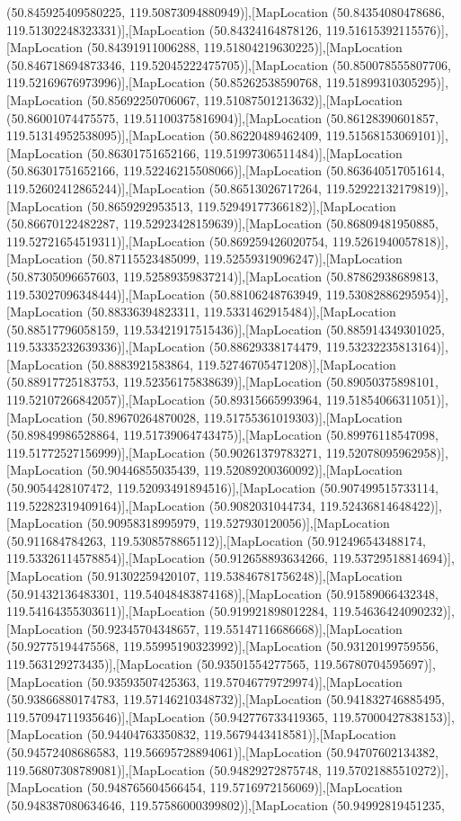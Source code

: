 (50.845925409580225, 119.50873094880949)],[MapLocation (50.84354080478686, 119.51302248323331)],[MapLocation (50.84324164878126, 119.51615392115576)],[MapLocation (50.84391911006288, 119.51804219630225)],[MapLocation (50.846718694873346, 119.52045222475705)],[MapLocation (50.850078555807706, 119.52169676973996)],[MapLocation (50.85262538590768, 119.51899310305295)],[MapLocation (50.85692250706067, 119.51087501213632)],[MapLocation (50.86001074475575, 119.51100375816904)],[MapLocation (50.86128390601857, 119.51314952538095)],[MapLocation (50.86220489462409, 119.51568153069101)],[MapLocation (50.86301751652166, 119.51997306511484)],[MapLocation (50.86301751652166, 119.52246215508066)],[MapLocation (50.863640517051614, 119.52602412865244)],[MapLocation (50.86513026717264, 119.52922132179819)],[MapLocation (50.8659292953513, 119.52949177366182)],[MapLocation (50.86670122482287, 119.52923428159639)],[MapLocation (50.86809481950885, 119.52721654519311)],[MapLocation (50.869259426020754, 119.5261940057818)],[MapLocation (50.87115523485099, 119.52559319096247)],[MapLocation (50.87305096657603, 119.52589359837214)],[MapLocation (50.87862938689813, 119.53027096348444)],[MapLocation (50.88106248763949, 119.53082886295954)],[MapLocation (50.88336394823311, 119.5331462915484)],[MapLocation (50.88517796058159, 119.53421917515436)],[MapLocation (50.885914349301025, 119.53335232639336)],[MapLocation (50.88629338174479, 119.53232235813164)],[MapLocation (50.8883921583864, 119.52746705471208)],[MapLocation (50.88917725183753, 119.52356175838639)],[MapLocation (50.89050375898101, 119.52107266842057)],[MapLocation (50.89315665993964, 119.51854066311051)],[MapLocation (50.89670264870028, 119.51755361019303)],[MapLocation (50.89849986528864, 119.51739064743475)],[MapLocation (50.89976118547098, 119.51772527156999)],[MapLocation (50.90261379783271, 119.52078095962958)],[MapLocation (50.90446855035439, 119.52089200360092)],[MapLocation (50.9054428107472, 119.52093491894516)],[MapLocation (50.907499515733114, 119.52282319409164)],[MapLocation (50.9082031044734, 119.52436814648422)],[MapLocation (50.90958318995979, 119.527930120056)],[MapLocation (50.911684784263, 119.5308578865112)],[MapLocation (50.912496543488174, 119.53326114578854)],[MapLocation (50.912658893634266, 119.53729518814694)],[MapLocation (50.91302259420107, 119.53846781756248)],[MapLocation (50.91432136483301, 119.54048483874168)],[MapLocation (50.91589066432348, 119.54164355303611)],[MapLocation (50.919921898012284, 119.54636424090232)],[MapLocation (50.92345704348657, 119.55147116686668)],[MapLocation (50.92775194475568, 119.55995190323992)],[MapLocation (50.93120199759556, 119.563129273435)],[MapLocation (50.93501554277565, 119.56780704595697)],[MapLocation (50.93593507425363, 119.57046779729974)],[MapLocation (50.93866880174783, 119.57146210348732)],[MapLocation (50.941832746885495, 119.57094711935646)],[MapLocation (50.942776733419365, 119.57000427838153)],[MapLocation (50.94404763350832, 119.5679443418581)],[MapLocation (50.94572408686583, 119.56695728894061)],[MapLocation (50.94707602134382, 119.56807308789081)],[MapLocation (50.94829272875748, 119.57021885510272)],[MapLocation (50.948765604566454, 119.5716972156069)],[MapLocation (50.948387080634646, 119.57586000399802)],[MapLocation (50.94992819451235, 